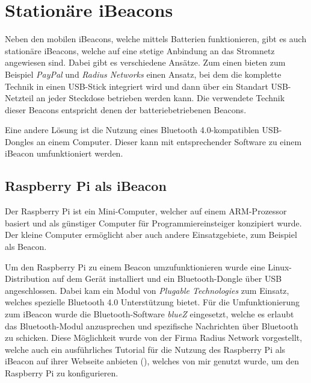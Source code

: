 \section{Stationäre iBeacons}
\label{sec:dataandmeasurement:stationarybeacon}
Neben den mobilen iBeacons, welche mittels Batterien funktionieren, gibt es auch stationäre iBeacons, welche auf eine stetige Anbindung an das Stromnetz angewiesen sind.
Dabei gibt es verschiedene Ansätze.
Zum einen bieten zum Beispiel \emph{PayPal} und \emph{Radius Networks} einen Ansatz, bei dem die komplette Technik in einen USB-Stick integriert wird und dann über ein Standart USB-Netzteil an jeder Steckdose betrieben werden kann. Die verwendete Technik dieser Beacons entspricht denen der batteriebetriebenen Beacons.

Eine andere Lösung ist die Nutzung eines Bluetooth 4.0-kompatiblen USB-Dongles an einem Computer. Dieser kann mit entsprechender Software zu einem iBeacon umfunktioniert werden.

\subsection{Raspberry Pi als iBeacon}
\label{sec:dataandmeasurement:stationarybeacon:raspberrypi}
Der Raspberry Pi ist ein Mini-Computer, welcher auf einem ARM-Prozessor basiert und als günstiger Computer für Programmiereinsteiger konzipiert wurde. Der kleine Computer ermöglicht aber auch andere Einsatzgebiete, zum Beispiel als Beacon.

Um den Raspberry Pi zu einem Beacon umzufunktionieren wurde eine Linux-Distribution auf dem Gerät installiert und ein Bluetooth-Dongle über USB angeschlossen. Dabei kam ein Modul von \emph{Plugable Technologies} zum Einsatz, welches spezielle Bluetooth 4.0 Unterstützung bietet.
Für die Umfunktionierung zum iBeacon wurde die Bluetooth-Software \emph{blueZ} eingesetzt, welche es erlaubt das Bluetooth-Modul anzusprechen und spezifische Nachrichten über Bluetooth zu schicken.
Diese Möglichkeit wurde von der Firma Radius Network vorgestellt, welche auch ein ausführliches Tutorial für die Nutzung des Raspberry Pi als iBeacon auf ihrer Webseite anbieten (\citet{radiusraspberry}), welches von mir genutzt wurde, um den Raspberry Pi zu konfigurieren.



